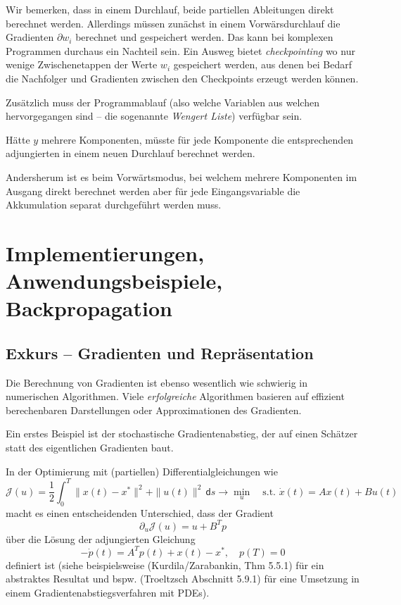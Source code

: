 \documentclass[
]{book}
\theoremstyle{definition}
\theoremstyle{definition}
\theoremstyle{definition}
\theoremstyle{definition}
\theoremstyle{remark}
\begin{document}
Wir bemerken, dass in einem Durchlauf, beide partiellen Ableitungen direkt
berechnet werden. Allerdings müssen zunächst in einem
Vorwärsdurchlauf die Gradienten \(\partial w_i\) berechnet und gespeichert werden.
Das kann bei komplexen Programmen durchaus ein Nachteil sein. Ein Ausweg bietet
\emph{checkpointing} wo nur wenige Zwischenetappen der Werte \(w_i\) gespeichert
werden, aus denen bei Bedarf die Nachfolger und Gradienten zwischen den
Checkpoints erzeugt werden können.

Zusätzlich muss der Programmablauf (also welche Variablen aus welchen
hervorgegangen sind -- die sogenannte \emph{Wengert Liste}) verfügbar sein.

Hätte \(y\) mehrere Komponenten, müsste
für jede Komponente die entsprechenden adjungierten in einem neuen
Durchlauf berechnet werden.

Andersherum ist es beim Vorwärtsmodus, bei welchem mehrere Komponenten im
Ausgang direkt berechnet werden aber für jede Eingangsvariable die
Akkumulation separat durchgeführt werden muss.

\hypertarget{implementierungen-anwendungsbeispiele-backpropagation}{%
\chapter{Implementierungen, Anwendungsbeispiele, Backpropagation}\label{implementierungen-anwendungsbeispiele-backpropagation}}

\hypertarget{exkurs-gradienten-und-repruxe4sentation}{%
\section{Exkurs -- Gradienten und Repräsentation}\label{exkurs-gradienten-und-repruxe4sentation}}

Die Berechnung von Gradienten ist ebenso wesentlich wie schwierig in numerischen
Algorithmen.
Viele \emph{erfolgreiche} Algorithmen basieren auf effizient berechenbaren
Darstellungen oder Approximationen des Gradienten.

Ein erstes Beispiel ist der stochastische Gradientenabstieg, der auf einen
Schätzer statt des eigentlichen Gradienten baut.

In der Optimierung mit (partiellen) Differentialgleichungen wie
\begin{equation*}
\mathcal J(u) = \frac 12 \int_0^T\|x(t)-x^*\|^2 + \|u(t)\|^2\,\mathsf{d}s\to \min_{u} \quad \text{s.t. }\dot x(t) =
Ax(t) + Bu(t)
\end{equation*}
macht es einen entscheidenden Unterschied, dass der Gradient
\[\partial_u \mathcal J(u) = u + B^Tp \]
über die Lösung der adjungierten Gleichung
\begin{equation*}
-\dot p(t) = A^T p(t) + x(t)-x^*, \quad p(T) = 0
\end{equation*}
definiert ist (siehe beispielsweise (Kurdila/Zarabankin, Thm 5.5.1) für ein
abstraktes Resultat und bspw. (Troeltzsch Abschnitt 5.9.1) für eine
Umsetzung in einem Gradientenabstiegsverfahren mit PDEs).
\end{document}
